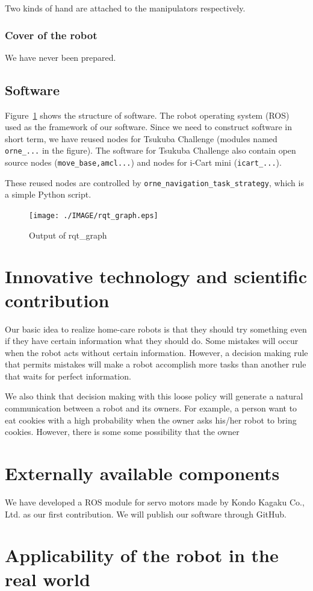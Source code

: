 \documentclass{llncs}
\begin{document}
Two kinds of hand are attached to
the manipulators respectively.

\subsubsection{Cover of the robot} We have never been prepared.

\subsection{Software}

Figure~\ref{fig:rqt_graph} shows the structure of software.
The robot operating system (ROS) used as the framework of our software.
Since we need to construct software in short term, 
we have reused nodes for Tsukuba Challenge (modules named
\texttt{orne\_...} in the figure).
The software for Tsukuba Challenge also contain open source nodes
(\texttt{move\_base,amcl...}) and nodes for i-Cart mini (\texttt{icart\_...}).

These reused nodes are controlled by
\texttt{orne\_navigation\_task\_strategy},
which is a simple Python script.

\begin{figure}[h]
	\begin{center}
		\texttt{[image: ./IMAGE/rqt\_graph.eps]}
		\caption{Output of rqt\_graph}
		\label{fig:rqt_graph}
	\end{center}
\end{figure}

\section{Innovative technology and scientific contribution}

Our basic idea to realize home-care robots is that they
should try something even if they have certain information
what they should do. Some mistakes will occur when the robot
acts without certain information.
However, a decision making rule that permits mistakes will make
a robot accomplish more tasks than another rule that waits for
perfect information.

We also think that decision making with this loose policy
will generate a natural communication between a robot and its owners.
For example, a person want to eat cookies
with a high probability when the owner asks his/her robot to bring cookies.
However, there is some some possibility that the owner

\section{Externally available components}

We have developed a ROS module for servo motors made
by Kondo Kagaku Co., Ltd.
as our first contribution\cite{hayashibara_kondo}.
We will publish our software through GitHub.

\section{Applicability of the robot in the real world}



\end{document}
